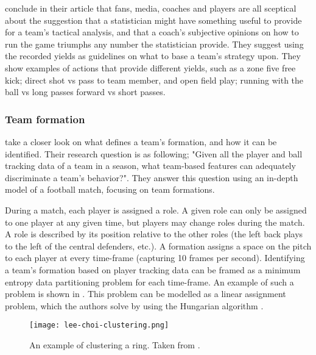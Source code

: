 \citet{bib:pollard-reep-1997} conclude in their article that fans, media, coaches and players are all sceptical about the suggestion that a statistician might have something useful to provide for a team's tactical analysis, and that a coach's subjective opinions on how to run the game triumphs any number the statistician provide. They suggest using the recorded yields as guidelines on what to base a team's strategy upon. They show examples of actions that provide different yields, such as a zone five free kick; direct shot vs pass to team member, and open field play; running with the ball vs long passes forward vs short passes.

\subsubsection{Team formation}

\citet{bib:bialkowski-lucey-carr-yue-sridharan-matthews-2014} take a closer look on what defines a team's formation, and how it can be identified. Their research question is as following; "Given all the player and ball tracking data of a team in a season, what team-based features can adequately discriminate a team’s behavior?". They answer this question using an in-depth model of a football match, focusing on team formations.

During a match, each player is assigned a role. A given role can only be assigned to one player at any given time, but players may change roles during the match. A role is described by its position relative to the other roles (the left back plays to the left of the central defenders, etc.). A formation assigns a space on the pitch to each player at every time-frame (capturing 10 frames per second). Identifying a team's formation based on player tracking data can be framed as a minimum entropy data partitioning problem \citep{bib:bialkowski-lucey-carr-yue-sridharan-matthews-2014} for each time-frame. An example of such a problem is shown in . This problem can be modelled as a linear assignment problem, which the authors solve by using the Hungarian algorithm \citep{bib:kuhn-1955}.

\begin{figure}
    \centering
    \texttt{[image: lee-choi-clustering.png]}
    \caption{An example of clustering a ring. Taken from \citet{bib:lee-choi-2004}.}
    \label{fig:lee-choi-clustering}
\end{figure}

